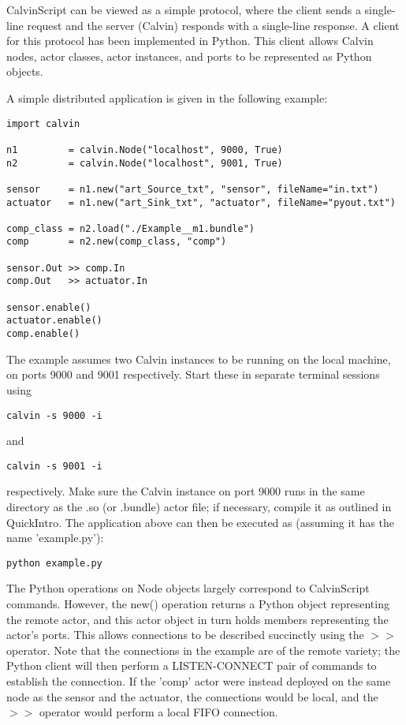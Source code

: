 \documentclass[10pt, a4paper]{article}
\begin{document}
CalvinScript can be viewed as a simple protocol, where the client
sends a single-line request and the server (Calvin) responds with a
single-line response. A client for this protocol has been implemented
in Python. This client allows Calvin nodes, actor classes, actor
instances, and ports to be represented as Python objects.

A simple distributed application is given in the following example:

\begin{verbatim}
import calvin

n1         = calvin.Node("localhost", 9000, True)
n2         = calvin.Node("localhost", 9001, True)

sensor     = n1.new("art_Source_txt", "sensor", fileName="in.txt")
actuator   = n1.new("art_Sink_txt", "actuator", fileName="pyout.txt")

comp_class = n2.load("./Example__m1.bundle")
comp       = n2.new(comp_class, "comp")

sensor.Out >> comp.In
comp.Out   >> actuator.In

sensor.enable()
actuator.enable()
comp.enable()
\end{verbatim}

The example assumes two Calvin instances to be running on the local
machine, on ports 9000 and 9001 respectively. Start these in separate
terminal sessions using

\begin{verbatim}
calvin -s 9000 -i
\end{verbatim}

and

\begin{verbatim}
calvin -s 9001 -i
\end{verbatim}

respectively. Make sure the Calvin instance on port 9000 runs in the
same directory as the .so (or .bundle) actor file; if necessary, compile it as
outlined in QuickIntro. The application above can then be executed as
(assuming it has the name 'example.py'):

\begin{verbatim}
python example.py
\end{verbatim}

The Python operations on Node objects largely correspond to
CalvinScript commands. However, the new() operation returns a Python
object representing the remote actor, and this actor object in turn
holds members representing the actor's ports. This allows connections
to be described succinctly using the $>>$ operator. Note that the
connections in the example are of the remote variety; the Python
client will then perform a LISTEN-CONNECT pair of commands to
establish the connection. If the 'comp' actor were instead deployed on
the same node as the sensor and the actuator, the connections would be
local, and the $>>$ operator would perform a local FIFO connection.
\end{document}
